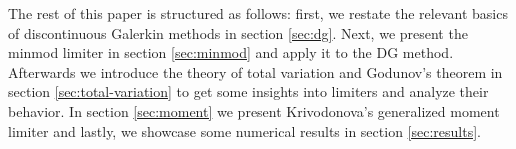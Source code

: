 The rest of this paper is structured as follows: first, we restate the relevant basics of discontinuous Galerkin methods in section \ref{sec:dg}.
Next, we present the minmod limiter in section \ref{sec:minmod} and apply it to the DG method.
Afterwards we introduce the theory of total variation and Godunov's theorem in section \ref{sec:total-variation} to get some insights into limiters and analyze their behavior.
In section \ref{sec:moment} we present Krivodonova's generalized moment limiter and lastly, we showcase some numerical results in section \ref{sec:results}.
